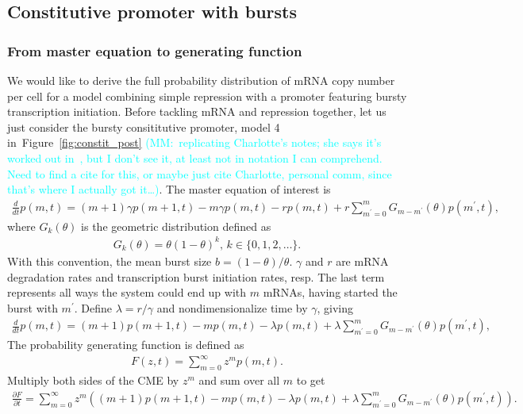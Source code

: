 \documentclass[12pt]{article}%
\newcommand{\mmnote}[1]{\textcolor{cyan}{(MM:~#1)}}
\newcommand{\deriv}[2][{}]{\frac{d #1}{d #2}}
\newcommand{\pderiv}[2][{}]{\frac{\partial #1}{\partial #2}}
\newcommand{\fig}[1]{Figure~\ref{#1}}
\begin{document}
\subsection{Constitutive promoter with bursts}

\subsubsection{From master equation to generating function}

We would like to derive the full probability distribution of
mRNA copy number per cell for a model combining simple repression
with a promoter featuring bursty transcription initiation.
Before tackling mRNA and repression together, let us
just consider the bursty consititutive promoter,
model 4 in~\fig{fig:constit_post}
\mmnote{replicating Charlotte's notes; she says it's worked out
in~\cite{Paulsson2000}, but I don't see it, at least not in notation I can
comprehend. Need to find a cite for this,
or maybe just cite Charlotte, personal comm, since that's where I actually got it\dots}.
The master equation of interest is
\begin{align}
\deriv{t}p(m,t) = (m+1)\gamma p(m+1,t) - m\gamma p(m,t) - r p(m,t)
        + r \sum_{m^\prime=0}^m G_{m-m^\prime}(\theta) p(m^\prime,t),
\label{eq:1state_unreg_003}
\end{align}
where $G_{k}(\theta)$ is the geometric distribution defined as
\begin{align}
G_{k}(\theta) = \theta(1 - \theta)^k, \, k\in\{0,1,2,\dots\}.
\end{align}
With this convention, the mean burst size $b = (1-\theta)/\theta$.
$\gamma$ and $r$ are mRNA degradation rates and transcription burst
initiation rates, resp. The last term represents all ways the system could
end up with $m$ mRNAs, having started the burst with $m^\prime$. Define
$\lambda = r/\gamma$ and nondimensionalize time by $\gamma$, giving
\begin{align}
\deriv{t}p(m,t) = (m+1)p(m+1,t) - m p(m,t) - \lambda p(m,t)
        + \lambda \sum_{m^\prime=0}^m G_{m-m^\prime}(\theta) p(m^\prime,t),
\end{align}
The probability generating function is defined as
\begin{align}
F(z,t) = \sum_{m=0}^\infty z^m p(m,t).
\end{align}
Multiply both sides of the CME by $z^m$ and sum over all $m$ to get
\begin{align}
\pderiv[F]{t} = \sum_{m=0}^\infty z^m
\left(
(m+1)p(m+1,t) - m p(m,t) - \lambda p(m,t)
+ \lambda \sum_{m^\prime=0}^m G_{m-m^\prime}(\theta) p(m^\prime,t)
\right).
\end{align}
\end{document}
